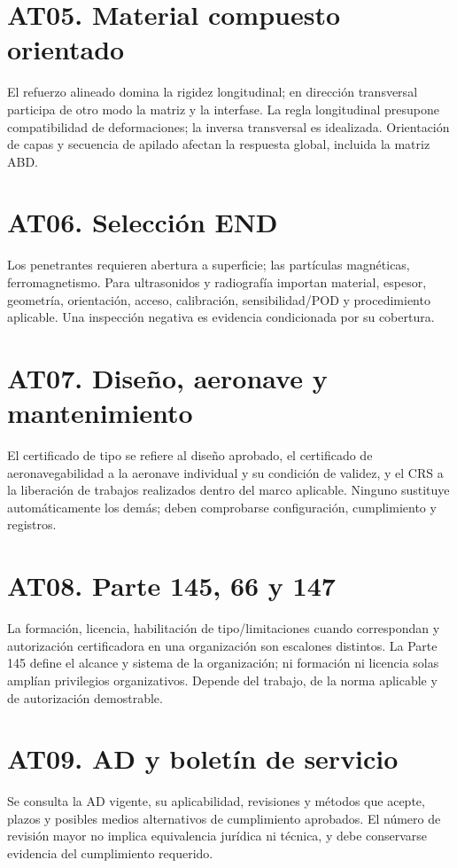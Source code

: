 \section*{AT05. Material compuesto orientado}
El refuerzo alineado domina la rigidez longitudinal; en dirección transversal participa de otro modo la matriz y la interfase. La regla longitudinal presupone compatibilidad de deformaciones; la inversa transversal es idealizada. Orientación de capas y secuencia de apilado afectan la respuesta global, incluida la matriz ABD.

\section*{AT06. Selección END}
Los penetrantes requieren abertura a superficie; las partículas magnéticas, ferromagnetismo. Para ultrasonidos y radiografía importan material, espesor, geometría, orientación, acceso, calibración, sensibilidad/POD y procedimiento aplicable. Una inspección negativa es evidencia condicionada por su cobertura.

\section*{AT07. Diseño, aeronave y mantenimiento}
El certificado de tipo se refiere al diseño aprobado, el certificado de aeronavegabilidad a la aeronave individual y su condición de validez, y el CRS a la liberación de trabajos realizados dentro del marco aplicable. Ninguno sustituye automáticamente los demás; deben comprobarse configuración, cumplimiento y registros.

\section*{AT08. Parte 145, 66 y 147}
La formación, licencia, habilitación de tipo/limitaciones cuando correspondan y autorización certificadora en una organización son escalones distintos. La Parte 145 define el alcance y sistema de la organización; ni formación ni licencia solas amplían privilegios organizativos. Depende del trabajo, de la norma aplicable y de autorización demostrable.

\section*{AT09. AD y boletín de servicio}
Se consulta la AD vigente, su aplicabilidad, revisiones y métodos que acepte, plazos y posibles medios alternativos de cumplimiento aprobados. El número de revisión mayor no implica equivalencia jurídica ni técnica, y debe conservarse evidencia del cumplimiento requerido.

